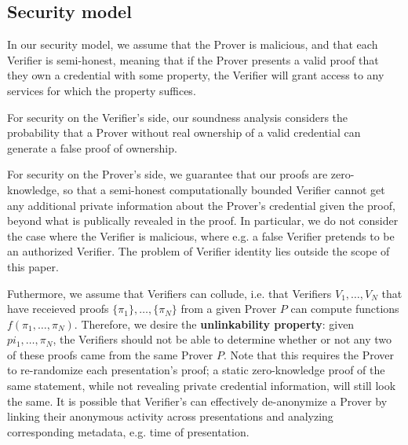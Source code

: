 \subsection{Security model}
\label{subsec:security-model}

In our security model, we assume that the Prover is malicious, and that each Verifier is semi-honest, meaning that if the Prover presents a valid proof that they own a credential with some property, the Verifier will grant access to any services for which the property suffices.


For security on the Verifier's side, our soundness analysis considers the probability that a Prover without real ownership of a valid credential can generate a false proof of ownership. 


For security on the Prover's side, we guarantee that our proofs are zero-knowledge, so that a semi-honest computationally bounded Verifier cannot get any additional private information about the Prover's credential given the proof, beyond what is publically revealed in the proof.
In particular, we do not consider the case where the Verifier is malicious, where e.g. a false Verifier pretends to be an authorized Verifier. The problem of Verifier identity lies outside the scope of this paper.


Futhermore, we assume that Verifiers can collude, i.e. that Verifiers $V_1, \dots, V_N$ that have receieved proofs $\{\pi_1\}, \dots, \{\pi_N\}$ from a given Prover $P$ can compute functions $f(\pi_1, \dots, \pi_N)$. 
Therefore, we desire the \textbf{unlinkability property}: given $pi_1, \dots, \pi_N$, the Verifiers should not be able to determine whether or not any two of these proofs came from the same Prover $P$.
Note that this requires the Prover to re-randomize each presentation's proof; a static zero-knowledge proof of the same statement, while not revealing private credential information, will still look the same.
It is possible that Verifier's can effectively de-anonymize a Prover by linking their anonymous activity across presentations and analyzing corresponding metadata, e.g. time of presentation.
